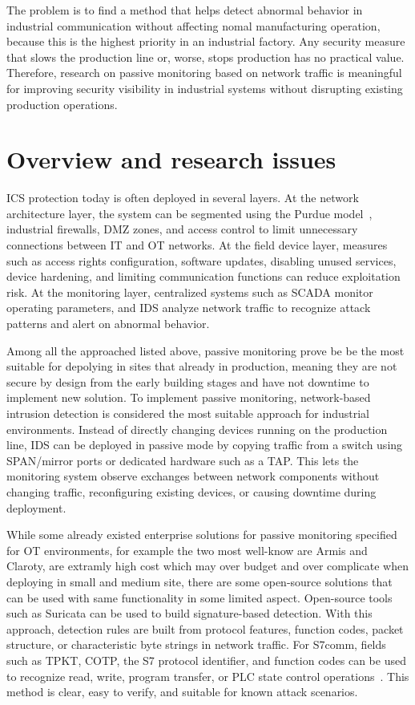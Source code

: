 \documentclass[../main.tex]{subfiles}
\begin{document}
The problem is to find a method that helps detect abnormal behavior in industrial communication without affecting nomal manufacturing operation, because this is the highest priority in an industrial factory. Any security measure that slows the production line or, worse, stops production has no practical value. Therefore, research on passive monitoring based on network traffic is meaningful for improving security visibility in industrial systems without disrupting existing production operations.

\section{Overview and research issues}
\label{sec:giaiphap}

ICS protection today is often deployed in several layers. At the network architecture layer, the system can be segmented using the Purdue model~\cite{williams1994purdue,iec62443}, industrial firewalls, DMZ zones, and access control to limit unnecessary connections between IT and OT networks. At the field device layer, measures such as access rights configuration, software updates, disabling unused services, device hardening, and limiting communication functions can reduce exploitation risk. At the monitoring layer, centralized systems such as SCADA monitor operating parameters, and IDS analyze network traffic to recognize attack patterns and alert on abnormal behavior.

Among all the approached listed above, passive monitoring prove be be the most suitable for depolying in sites that already in production, meaning they are not secure by design from the early building stages and have not downtime to implement new solution. To implement passive monitoring, network-based intrusion detection is considered the most suitable approach for industrial environments. Instead of directly changing devices running on the production line, IDS can be deployed in passive mode by copying traffic from a switch using SPAN/mirror ports or dedicated hardware such as a TAP. This lets the monitoring system observe exchanges between network components without changing traffic, reconfiguring existing devices, or causing downtime during deployment.

While some already existed enterprise solutions for passive monitoring specified for OT environments, for example the two most well-know are Armis and Claroty, are extramly high cost which may over budget and over complicate when deploying in small and medium site, there are some open-source solutions that can be used with same functionality in some limited aspect. Open-source tools such as Suricata can be used to build signature-based detection. With this approach, detection rules are built from protocol features, function codes, packet structure, or characteristic byte strings in network traffic. For S7comm, fields such as TPKT, COTP, the S7 protocol identifier, and function codes can be used to recognize read, write, program transfer, or PLC state control operations~\cite{snap7_s7protocol,gmiru_s7comm_part1,gmiru_s7comm_part2}. This method is clear, easy to verify, and suitable for known attack scenarios.
\end{document}
